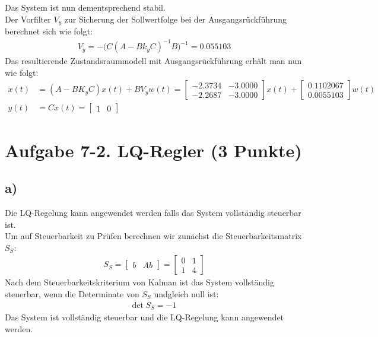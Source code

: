 \documentclass[11pt]{scrartcl} %
\begin{document}
Das System ist nun dementsprechend stabil.\\
Der Vorfilter $V_y$ zur Sicherung der Sollwertfolge bei der Ausgangsrückführung berechnet sich wie folgt:
\begin{align*}
	V_y=-\bigl(C(A-Bk_yC)^{-1}B\bigr)^{-1}=0.055103
\end{align*}
Das resultierende Zustandsraummodell mit Ausgangsrückführung erhält man nun wie folgt:
\begin{align*}
	\dot{x}(t)&=(A-BK_yC)x(t)+BV_yw(t)=\begin{bmatrix}-2.3734&-3.0000\\-2.2687&-3.0000\end{bmatrix}x(t)+\begin{bmatrix}0.1102067\\0.0055103\end{bmatrix}w(t)\\
	y(t)&=Cx(t)=\begin{bmatrix}1&0\end{bmatrix}
\end{align*}
\section*{Aufgabe 7-2. LQ-Regler (3 Punkte)}
\subsection*{a)}
Die LQ-Regelung kann angewendet werden falls das System vollständig steuerbar ist.\\
Um auf Steuerbarkeit zu Prüfen berechnen wir zunächst die Steuerbarkeitsmatrix $S_S$:
\begin{align*}
	S_S=\begin{bmatrix}b&Ab\end{bmatrix}=\begin{bmatrix}0&1\\1&4\end{bmatrix}
\end{align*}
Nach dem Steuerbarkeitskriterium von Kalman ist das System vollständig steuerbar, wenn die Determinate von $S_S$ undgleich null ist:
\begin{align*}
	\text{det}\hspace{3pt}S_S=-1
\end{align*}
Das System ist vollständig steuerbar und die LQ-Regelung kann angewendet werden.
\end{document}
